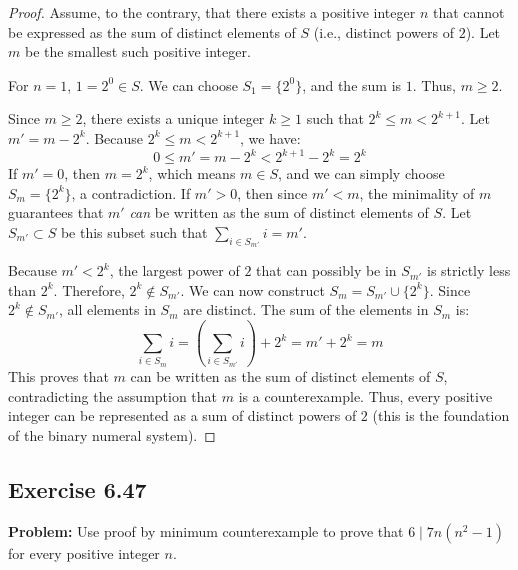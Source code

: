 \documentclass[11pt, a4paper]{article}
\theoremstyle{definition}
\theoremstyle{remark}
\begin{document}
\begin{proof}
Assume, to the contrary, that there exists a positive integer $n$ that cannot be expressed as the sum of distinct elements of $S$ (i.e., distinct powers of $2$). Let $m$ be the smallest such positive integer.

For $n=1$, $1 = 2^0 \in S$. We can choose $S_1 = \{2^0\}$, and the sum is $1$. Thus, $m \ge 2$.

Since $m \ge 2$, there exists a unique integer $k \ge 1$ such that $2^k \le m < 2^{k+1}$. 
Let $m' = m - 2^k$. Because $2^k \le m < 2^{k+1}$, we have:
\[
0 \le m' = m - 2^k < 2^{k+1} - 2^k = 2^k
\]
If $m' = 0$, then $m = 2^k$, which means $m \in S$, and we can simply choose $S_m = \{2^k\}$, a contradiction.
If $m' > 0$, then since $m' < m$, the minimality of $m$ guarantees that $m'$ \textit{can} be written as the sum of distinct elements of $S$. Let $S_{m'} \subset S$ be this subset such that $\sum_{i \in S_{m'}} i = m'$.

Because $m' < 2^k$, the largest power of $2$ that can possibly be in $S_{m'}$ is strictly less than $2^k$. Therefore, $2^k \notin S_{m'}$.
We can now construct $S_m = S_{m'} \cup \{2^k\}$. Since $2^k \notin S_{m'}$, all elements in $S_m$ are distinct. The sum of the elements in $S_m$ is:
\[
\sum_{i \in S_m} i = \left( \sum_{i \in S_{m'}} i \right) + 2^k = m' + 2^k = m
\]
This proves that $m$ can be written as the sum of distinct elements of $S$, contradicting the assumption that $m$ is a counterexample. Thus, every positive integer can be represented as a sum of distinct powers of $2$ (this is the foundation of the binary numeral system).
\end{proof}

\subsection{Exercise 6.47}
\textbf{Problem:} Use proof by minimum counterexample to prove that $6 \mid 7n(n^2 - 1)$ for every positive integer $n$.
\end{document}
